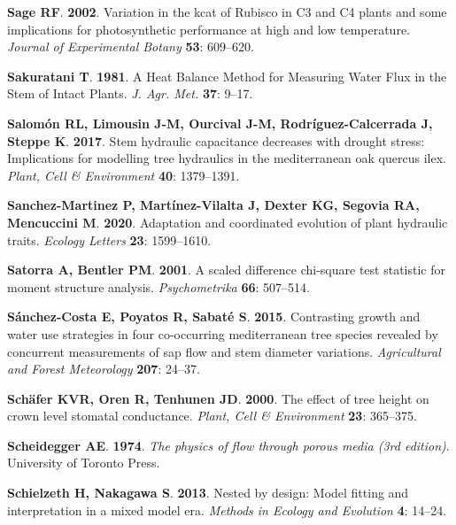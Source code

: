 \documentclass[11pt,twoside]{reedthesis}
\begin{document}
\hypertarget{ref-Sage2002}{}
\textbf{\textnormal{Sage RF}}. \textbf{2002}. Variation in the kcat of
Rubisco in C3 and C4 plants and some implications for photosynthetic
performance at high and low temperature. \emph{Journal of Experimental
Botany} \textbf{53}: 609--620.

\hypertarget{ref-Sakuratani1981}{}
\textbf{\textnormal{Sakuratani T}}. \textbf{1981}. A Heat Balance Method
for Measuring Water Flux in the Stem of Intact Plants. \emph{J. Agr.
Met.} \textbf{37}: 9--17.

\hypertarget{ref-Salomon2017}{}
\textbf{\textnormal{Salomón RL}, \textnormal{Limousin J-M},
\textnormal{Ourcival J-M}, \textnormal{Rodríguez-Calcerrada J},
\textnormal{Steppe K}}. \textbf{2017}. Stem hydraulic capacitance
decreases with drought stress: Implications for modelling tree
hydraulics in the mediterranean oak quercus ilex. \emph{Plant, Cell \&
Environment} \textbf{40}: 1379--1391.

\hypertarget{ref-SanchezMartinez2020}{}
\textbf{\textnormal{Sanchez-Martinez P}, \textnormal{Martínez-Vilalta
J}, \textnormal{Dexter KG}, \textnormal{Segovia RA},
\textnormal{Mencuccini M}}. \textbf{2020}. Adaptation and coordinated
evolution of plant hydraulic traits. \emph{Ecology Letters} \textbf{23}:
1599--1610.

\hypertarget{ref-satorra_scaled_2001}{}
\textbf{\textnormal{Satorra A}, \textnormal{Bentler PM}}. \textbf{2001}.
A scaled difference chi-square test statistic for moment structure
analysis. \emph{Psychometrika} \textbf{66}: 507--514.

\hypertarget{ref-Sanchezcosta2015}{}
\textbf{\textnormal{Sánchez-Costa E}, \textnormal{Poyatos R},
\textnormal{Sabaté S}}. \textbf{2015}. Contrasting growth and water use
strategies in four co-occurring mediterranean tree species revealed by
concurrent measurements of sap flow and stem diameter variations.
\emph{Agricultural and Forest Meteorology} \textbf{207}: 24--37.

\hypertarget{ref-Schafer2000}{}
\textbf{\textnormal{Schäfer KVR}, \textnormal{Oren R},
\textnormal{Tenhunen JD}}. \textbf{2000}. The effect of tree height on
crown level stomatal conductance. \emph{Plant, Cell \& Environment}
\textbf{23}: 365--375.

\hypertarget{ref-Scheidegger1974}{}
\textbf{\textnormal{Scheidegger AE}}. \textbf{1974}. \emph{The physics
of flow through porous media (3rd edition)}. University of Toronto
Press.

\hypertarget{ref-Schielzeth2013}{}
\textbf{\textnormal{Schielzeth H}, \textnormal{Nakagawa S}}.
\textbf{2013}. Nested by design: Model fitting and interpretation in a
mixed model era. \emph{Methods in Ecology and Evolution} \textbf{4}:
14--24.
\end{document}
